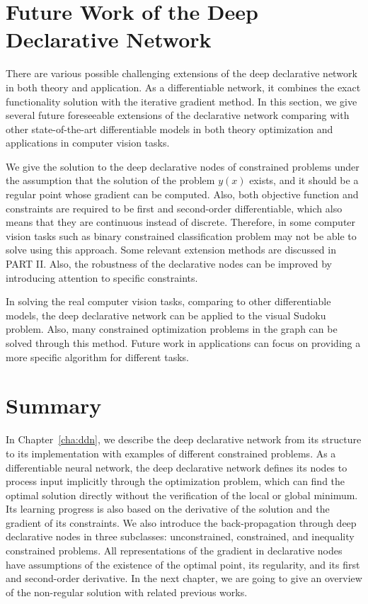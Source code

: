 \section{Future Work of the Deep Declarative Network}
There are various possible challenging extensions of the deep declarative network in both theory and application. As a differentiable network, it combines the exact functionality solution with the iterative gradient method. In this section, we give several future foreseeable extensions of the declarative network comparing with other state-of-the-art differentiable models in both theory optimization and applications in computer vision tasks. 
\par We give the solution to the deep declarative nodes of constrained problems under the assumption that the solution of the problem $y(x)$ exists, and it should be a regular point whose gradient can be computed. Also, both objective function and constraints are required to be first and second-order differentiable, which also means that they are continuous instead of discrete. Therefore, in some computer vision tasks such as binary constrained classification problem may not be able to solve using this approach. Some relevant extension methods are discussed in PART II. Also, the robustness of the declarative nodes can be improved by introducing attention to specific constraints. 
\par In solving the real computer vision tasks, comparing to other differentiable models, the deep declarative network can be applied to the visual Sudoku problem. Also, many constrained optimization problems in the graph can be solved through this method. Future work in applications can focus on providing a more specific algorithm for different tasks. 

\section{Summary}
In Chapter~\ref{cha:ddn}, we describe the deep declarative network from its structure to its implementation with examples of different constrained problems. As a differentiable neural network, the deep declarative network defines its nodes to process input implicitly through the optimization problem, which can find the optimal solution directly without the verification of the local or global minimum. Its learning progress is also based on the derivative of the solution and the gradient of its constraints. We also introduce the back-propagation through deep declarative nodes in three subclasses: unconstrained, constrained, and inequality constrained problems. All representations of the gradient in declarative nodes have assumptions of the existence of the optimal point, its regularity, and its first and second-order derivative. In the next chapter, we are going to give an overview of the non-regular solution with related previous works. 
